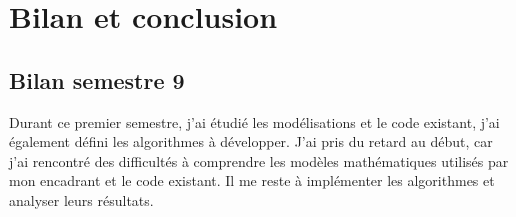 \chapter{Bilan et conclusion}

\section{Bilan semestre 9}
Durant ce premier semestre, j'ai étudié les modélisations et le code existant, j'ai également défini les algorithmes à développer.
J'ai pris du retard au début, car j'ai rencontré des difficultés à comprendre les modèles mathématiques utilisés par mon encadrant et le code existant.
Il me reste à implémenter les algorithmes et analyser leurs résultats.
